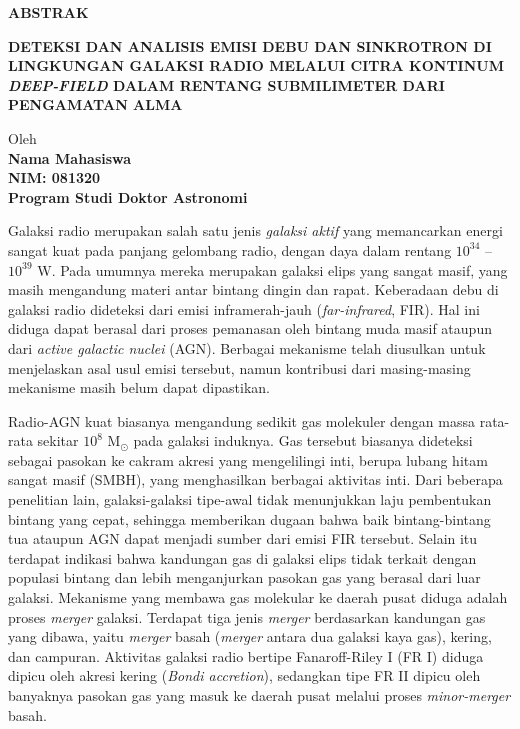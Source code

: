 \begin{center}
\textbf{ABSTRAK}

\vspace{0.5cm}

\textbf{DETEKSI DAN ANALISIS EMISI DEBU DAN SINKROTRON DI LINGKUNGAN GALAKSI RADIO MELALUI 
CITRA KONTINUM \textit{DEEP-FIELD} DALAM RENTANG SUBMILIMETER DARI PENGAMATAN ALMA}\\
\vspace{0.5cm}

Oleh\\
\textbf{Nama Mahasiswa\\
NIM: 081320\\
Program Studi Doktor Astronomi}\\
\end{center}

\vspace{1.0cm}
\restoreparskip
Galaksi radio merupakan salah satu jenis {\it galaksi aktif} yang memancarkan energi sangat kuat pada panjang gelombang radio, dengan daya dalam rentang $10^{34}$ -- $10^{39}$ W. Pada umumnya mereka merupakan galaksi elips yang sangat masif, yang masih mengandung materi antar bintang dingin dan rapat. Keberadaan debu di galaksi radio dideteksi dari emisi inframerah-jauh (\textit{far-infrared}, FIR). Hal ini diduga dapat berasal dari proses pemanasan oleh bintang muda masif ataupun dari \textit{active galactic nuclei} (AGN). Berbagai mekanisme telah diusulkan untuk menjelaskan asal usul emisi tersebut, namun kontribusi dari masing-masing mekanisme masih belum dapat dipastikan.

Radio-AGN kuat biasanya mengandung sedikit gas molekuler dengan massa rata-rata sekitar $10^8$ M$_\odot$ pada galaksi induknya. Gas tersebut biasanya dideteksi sebagai pasokan ke cakram akresi yang mengelilingi inti, berupa lubang hitam sangat masif (SMBH), yang menghasilkan berbagai aktivitas inti. Dari beberapa penelitian lain, galaksi-galaksi tipe-awal tidak menunjukkan laju pembentukan bintang yang cepat, sehingga memberikan dugaan bahwa baik bintang-bintang tua ataupun AGN dapat menjadi sumber dari emisi FIR tersebut. Selain itu terdapat indikasi bahwa kandungan gas di galaksi elips tidak terkait dengan populasi bintang dan lebih menganjurkan pasokan gas yang berasal dari luar galaksi. Mekanisme yang membawa gas molekular ke daerah pusat diduga adalah proses \textit{merger} galaksi. Terdapat tiga jenis \textit{merger} berdasarkan kandungan gas yang dibawa, yaitu \textit{merger} basah (\textit{merger} antara dua galaksi kaya gas), kering, dan campuran.  Aktivitas galaksi radio bertipe Fanaroff-Riley I (FR I) diduga dipicu oleh akresi kering (\textit{Bondi accretion}), sedangkan tipe FR II dipicu oleh banyaknya pasokan gas yang masuk ke daerah pusat melalui proses \textit{minor-merger} basah.

